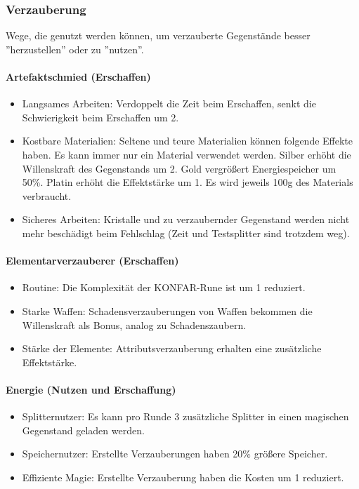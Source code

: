 \documentclass{article}
\begin{document}
\subsubsection{Verzauberung}

Wege, die genutzt werden können, um verzauberte Gegenstände besser ''herzustellen'' oder zu ''nutzen''.

\paragraph{Artefaktschmied (Erschaffen)}

\begin{itemize}
\item Langsames Arbeiten: Verdoppelt die Zeit beim Erschaffen, senkt die Schwierigkeit beim Erschaffen um 2.
\item Kostbare Materialien: Seltene und teure Materialien können folgende Effekte haben. Es kann immer nur ein Material verwendet werden. Silber erhöht die Willenskraft des Gegenstands um 2. Gold vergrößert Energiespeicher um 50\%. Platin erhöht die Effektstärke um 1. Es wird jeweils 100g des Materials verbraucht.
\item Sicheres Arbeiten: Kristalle und zu verzaubernder Gegenstand werden nicht mehr beschädigt beim Fehlschlag (Zeit und Testsplitter sind trotzdem weg).
\end{itemize}

\paragraph{Elementarverzauberer (Erschaffen)}

\begin{itemize}
\item Routine: Die Komplexität der KONFAR-Rune ist um 1 reduziert.
\item Starke Waffen: Schadensverzauberungen von Waffen bekommen die Willenskraft als Bonus, analog zu Schadenszaubern.
\item Stärke der Elemente: Attributsverzauberung erhalten eine zusätzliche Effektstärke.
\end{itemize}

\paragraph{Energie (Nutzen und Erschaffung)}

\begin{itemize}
\item Splitternutzer: Es kann pro Runde 3 zusätzliche Splitter in einen magischen Gegenstand geladen werden.
\item Speichernutzer: Erstellte Verzauberungen haben 20\% größere Speicher.
\item Effiziente Magie: Erstellte Verzauberung haben die Kosten um 1 reduziert.
\end{itemize}
\end{document}
